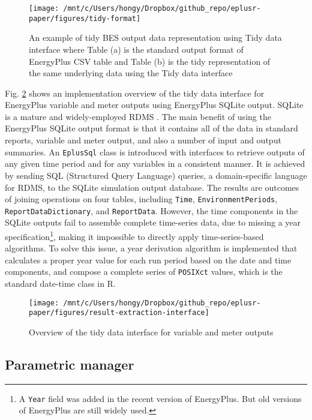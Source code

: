 \documentclass[3p, times]{elsarticle} %
\begin{document}
\begin{figure}[!htb]
\texttt{[image: /mnt/c/Users/hongy/Dropbox/github\_repo/eplusr-paper/figures/tidy-format]} \caption{An example of tidy BES output data representation using Tidy data interface where Table (a) is the standard output format of EnergyPlus CSV table and Table (b) is the tidy representation of the same underlying data using the Tidy data interface}\label{fig:tidy-format}
\end{figure}

Fig. \ref{fig:tidy-extractor} shows an implementation overview of the tidy
data interface for EnergyPlus variable and meter outputs using EnergyPlus
SQLite output.
SQLite is a mature and widely-employed RDMS \citep{Owens2006}.
The main benefit of using the EnergyPlus SQLite output format is that it
contains all of the data in standard reports, variable and meter output, and
also a number of input and output summaries.
An \texttt{EplusSql} class is introduced with interfaces to retrieve outputs of any
given time period and for any variables in a consistent manner.
It is achieved by sending SQL (Structured Query Language) queries, a
domain-specific language for RDMS, to the SQLite simulation output database.
The results are outcomes of joining operations on four tables, including
\texttt{Time}, \texttt{EnvironmentPeriods}, \texttt{ReportDataDictionary}, and \texttt{ReportData}.
However, the time components in the SQLite outputs fail to assemble complete
time-series data, due to missing a year specification\footnote{A \texttt{Year} field was added
  in the recent version of EnergyPlus. But old versions of EnergyPlus are still
  widely used.}, making it impossible to directly apply time-series-based
algorithms.
To solve this issue, a year derivation algorithm is implemented that calculates
a proper year value for each run period based on the date and time components,
and compose a complete series of \texttt{POSIXct} values, which is the standard
date-time class in R.

\begin{figure}[!htb]
\texttt{[image: /mnt/c/Users/hongy/Dropbox/github\_repo/eplusr-paper/figures/result-extraction-interface]} \caption{Overview of the tidy data interface for variable and meter outputs}\label{fig:tidy-extractor}
\end{figure}

\hypertarget{sec:eplusr-parametric}{%
\subsection{Parametric manager}\label{sec:eplusr-parametric}}
\end{document}
